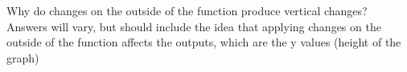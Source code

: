{Why do changes on the outside of the function produce vertical changes?}
{Answers will vary, but should include the idea that applying changes on the outside of the function affects the outputs, which are the y values (height of the graph)}
